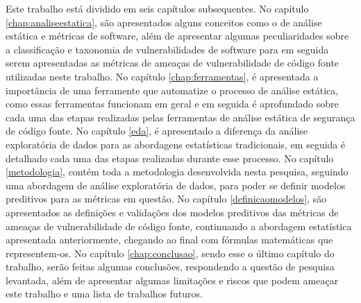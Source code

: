 Este trabalho está dividido em seis capítulos subsequentes. No capítulo
\ref{chap:analiseestatica}, são apresentados alguns conceitos como o de análise
estática e métricas de software, além de apresentar algumas peculiaridades sobre
a classificação e taxonomia de vulnerabilidades de software para em seguida
serem apresentadas as métricas de ameaças de vulnerabilidade de código fonte
utilizadas neste trabalho. No capítulo \ref{chap:ferramentas}, é apresentada a
importância de uma ferramente que automatize o processo de análise estática,
como essas ferramentas funcionam em geral e em seguida é aprofundado sobre cada
uma das etapas realizadas pelas ferramentas de análise estática de segurança de
código fonte. No capítulo \ref{eda}, é apresentado a diferença da análise
exploratória de dados para as abordagens estatísticas tradicionais, em seguida é
detalhado cada uma das etapas realizadas durante esse processo. No capítulo
\ref{metodologia}, contém toda a metodologia desenvolvida nesta pesquisa,
seguindo uma abordagem de análise exploratória de dados, para poder se definir
modelos preditivos para as métricas em questão. No capítulo
\ref{definicaomodelos}, são apresentados as definições e validações dos modelos
preditivos das métricas de ameaças de vulnerabilidade de código fonte,
continuando a abordagem estatística apresentada anteriormente, chegando ao final
com fórmulas matemáticas que representem-os. No capítulo \ref{chap:conclusao},
sendo esse o último capítulo do trabalho, serão feitas algumas conclusões,
respondendo a questão de pesquisa levantada, além de apresentar algumas
limitações e riscos que podem ameaçar este trabalho e uma lista de trabalhos
futuros.


